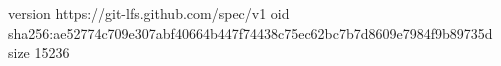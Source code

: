 version https://git-lfs.github.com/spec/v1
oid sha256:ae52774c709e307abf40664b447f74438c75ec62bc7b7d8609e7984f9b89735d
size 15236
